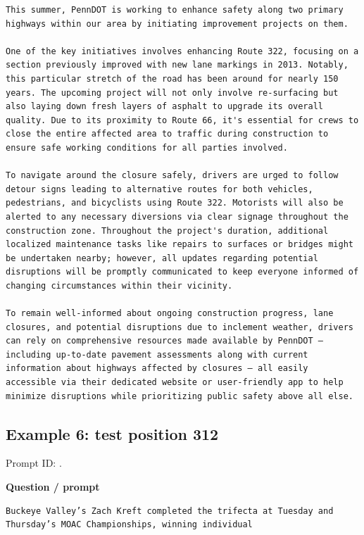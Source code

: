 \begin{Verbatim}
This summer, PennDOT is working to enhance safety along two primary highways within our area by initiating improvement projects on them. 

One of the key initiatives involves enhancing Route 322, focusing on a section previously improved with new lane markings in 2013. Notably, this particular stretch of the road has been around for nearly 150 years. The upcoming project will not only involve re-surfacing but also laying down fresh layers of asphalt to upgrade its overall quality. Due to its proximity to Route 66, it's essential for crews to close the entire affected area to traffic during construction to ensure safe working conditions for all parties involved.

To navigate around the closure safely, drivers are urged to follow detour signs leading to alternative routes for both vehicles, pedestrians, and bicyclists using Route 322. Motorists will also be alerted to any necessary diversions via clear signage throughout the construction zone. Throughout the project's duration, additional localized maintenance tasks like repairs to surfaces or bridges might be undertaken nearby; however, all updates regarding potential disruptions will be promptly communicated to keep everyone informed of changing circumstances within their vicinity.

To remain well-informed about ongoing construction progress, lane closures, and potential disruptions due to inclement weather, drivers can rely on comprehensive resources made available by PennDOT – including up-to-date pavement assessments along with current information about highways affected by closures – all easily accessible via their dedicated website or user-friendly app to help minimize disruptions while prioritizing public safety above all else.
\end{Verbatim}

\subsection{Example 6: test position
312}\label{record-docs-watermarking-qualitative-paper-kgw-bira-md-example-6-test-position-312}

Prompt ID:
\texttt{}.

\textbf{Question / prompt}

\begin{Verbatim}
Buckeye Valley’s Zach Kreft completed the trifecta at Tuesday and Thursday’s MOAC Championships, winning individual
\end{Verbatim}

